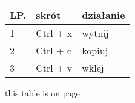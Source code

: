 \begin{table}
\begin{tabular}{|l|l|l|}
\hline
\textbf{LP.} & \textbf{skrót} & \textbf{działanie} \\ \hline
1            & Ctrl + x       & wytnij             \\ \hline
2            & Ctrl + c       & kopiuj             \\ \hline
3            & Ctrl + v       & wklej             \\ \hline
\end{tabular}
\label{table}
this table is on page \pageref{table}
\end{table}